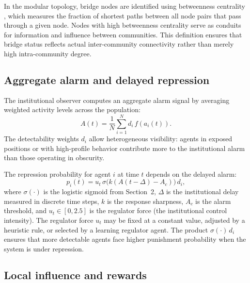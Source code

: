 In the modular topology, bridge nodes are identified using betweenness centrality \citep{freeman1977betweenness}, which measures the fraction of shortest paths between all node pairs that pass through a given node. Nodes with high betweenness centrality serve as conduits for information and influence between communities. This definition ensures that bridge status reflects actual inter-community connectivity rather than merely high intra-community degree.

\subsection{Aggregate alarm and delayed repression}

The institutional observer computes an aggregate alarm signal by averaging weighted activity levels across the population:
\begin{equation}
    A(t)=\frac{1}{N}\sum_{i=1}^{N} d_i\, f(a_i(t)).
\end{equation}
The detectability weights $d_i$ allow heterogeneous visibility: agents in exposed positions or with high-profile behavior contribute more to the institutional alarm than those operating in obscurity.

The repression probability for agent $i$ at time $t$ depends on the delayed alarm:
\begin{equation}
    p_i(t)=u_t\,\sigma\bigl(k(A(t-\Delta)-A_c)\bigr)\,d_i,
\end{equation}
where $\sigma(\cdot)$ is the logistic sigmoid from Section~2, $\Delta$ is the institutional delay measured in discrete time steps, $k$ is the response sharpness, $A_c$ is the alarm threshold, and $u_t \in [0, 2.5]$ is the regulator force (the institutional control intensity). The regulator force $u_t$ may be fixed at a constant value, adjusted by a heuristic rule, or selected by a learning regulator agent. The product $\sigma(\cdot)\,d_i$ ensures that more detectable agents face higher punishment probability when the system is under repression.

\subsection{Local influence and rewards}

